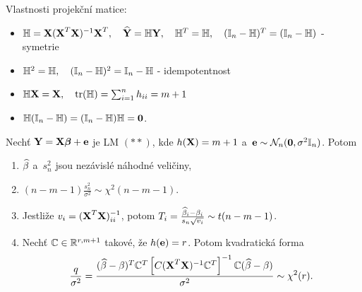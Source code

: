 \begin{remark}
	Vlastnosti projekční matice:
	\begin{itemize}
		\item $\mathbb{H} = \textbf{X} (\textbf{X}^T \textbf{X})^{-1} \textbf{X}^T, \quad \widehat{\textbf{Y}} = \mathbb{H} \textbf{Y}, \quad \mathbb{H}^T = \mathbb{H}, \quad (\mathbb{I}_{n} - \mathbb{H})^T = (\mathbb{I}_{n} - \mathbb{H})$ - symetrie
		\item $\mathbb{H}^2 = \mathbb{H}, \quad (\mathbb{I}_{n} - \mathbb{H})^2 = \mathbb{I}_{n} - \mathbb{H}$ - idempotentnost
		\item $\mathbb{H} \textbf{X} = \textbf{X}, \quad \text{tr}(\mathbb{H}) = \sum_{i = 1}^n h_{ii} = m + 1$
		\item $\mathbb{H}(\mathbb{I}_{n} - \mathbb{H}) = (\mathbb{I}_{n} - \mathbb{H}) \mathbb{H} = \boldsymbol{0}$.
	\end{itemize}
\end{remark}

\begin{theorem}
	Nechť $\textbf{Y} = \textbf{X} \boldsymbol{\beta} + \textbf{e}$ je LM $(**)$, kde $h(\textbf{X}) = m + 1$ a~$\textbf{e} \sim \mathcal{N}_n(\boldsymbol{0},\sigma^2 \mathbb{I}_{n})$. Potom
	\begin{enumerate}
		\item $\widehat{\beta}$ a~$s_n^2$ jsou nezávislé náhodné veličiny,
		\item $(n - m - 1) \frac{s_n^2}{\sigma^2} \sim \chi^2(n - m - 1)$.
		\item Jestliže $v_i = (\textbf{X}^T \textbf{X})_{ii}^{-1}$, potom $T_i = \frac{\widehat{\beta}_i - \beta_i}{s_n \sqrt{v_i}} \sim t(n-m-1)$.
		\item Nechť $\mathbb{C} \in \mathbb{R}^{r,m+1}$ takové, že $h(\textbf{e}) = r$. Potom kvadratická forma
		 $$
			\frac{q}{\sigma^2} = \frac{(\widehat{\beta} - \beta)^T \mathbb{C}^T \left[C (\textbf{X}^T \textbf{X})^{-1} \mathbb{C}^T \right]^{-1} \mathbb{C} (\widehat{\beta} - \beta)}{\sigma^2} \sim \chi^2(r).
		 $$
	\end{enumerate}
\end{theorem}
